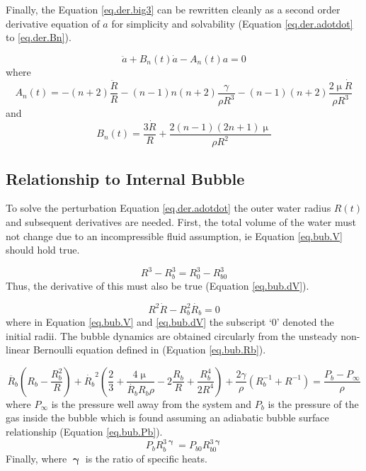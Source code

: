 \noindent Finally, the Equation \ref{eq.der.big3} can be rewritten cleanly as a second order derivative equation of $a$ for simplicity and solvability (Equation \ref{eq.der.adotdot} to \ref{eq.der.Bn}).

\begin{equation}\label{eq.der.adotdot}
	\ddot{a} + B_n(t) \dot{a} - A_n(t) a = 0
\end{equation}
\noindent where
\begin{equation}\label{eq.der.An}
A_n(t) = -(n+2) \frac{\ddot{R}}{R} - (n-1)n(n+2) \frac{\gamma}{\rho R^3} -(n-1) (n+2) \frac{2\upmu \dot{R}}{\rho R^3}
\end{equation}
\noindent and
\begin{equation}\label{eq.der.Bn}
	B_n(t) = \frac{3\dot{R}}{R} + \frac{2(n-1)(2n+1)\upmu}{\rho R^2}
\end{equation}

\subsection{Relationship to Internal Bubble} \label{Sect.SE.Bub}
\noindent To solve the perturbation Equation \ref{eq.der.adotdot} the outer water radius $R(t)$ and subsequent derivatives are needed. First, the total volume of the water must not change due to an incompressible fluid assumption, ie Equation \ref{eq.bub.V} should hold true.

\begin{equation}\label{eq.bub.V}
R^3 - R_b^3 = R_0^3 - R^3_{b0} 
\end{equation}
\noindent Thus, the derivative of this must also be true (Equation \ref{eq.bub.dV}).

\begin{equation}\label{eq.bub.dV}
R^2\dot{R} - R_b^2\dot{R_b} = 0
\end{equation}
\noindent where in Equation \ref{eq.bub.V} and \ref{eq.bub.dV} the subscript `0' denoted the initial radii. The bubble dynamics are obtained circularly from the unsteady non-linear Bernoulli equation defined in \cite{Zeng2018} (Equation \ref{eq.bub.Rb}).

\begin{equation} \label{eq.bub.Rb}
\ddot{R_b}\left( R_b - \frac{R_b^2}{R} \right) + \dot{R_b}^2 \left( \frac{2}{3} + \frac{4\upmu}{\dot{R_b} R_b \rho} -2\frac{R_b}{R}  + \frac{R_b^4}{2R^4} \right) + \frac{2\gamma}{\rho}\left( R_b^{-1} +R^{-1} \right) = \frac{P_b - P_{\infty}}{\rho}
\end{equation}
\noindent where $P_{\infty}$ is the pressure well away from the system and $P_b$ is the pressure of the gas inside the bubble which is found assuming an adiabatic bubble surface relationship (Equation \ref{eq.bub.Pb}).
\begin{equation} \label{eq.bub.Pb}
P_b R_b^{3\bm{\upgamma}} = P_{b0}R_{b0}^{3\bm{\upgamma}}
\end{equation}
\noindent Finally, where $\bm{\upgamma}$ is the ratio of specific heats.
